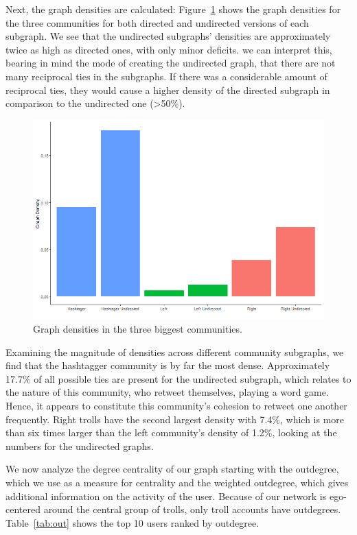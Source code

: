 \documentclass[12pt, titlepage=true, toc=bib]{scrartcl}
\begin{document}
Next, the graph densities are calculated: Figure~\ref{fig:dens} shows the graph densities for the three communities for both directed and undirected versions of each subgraph. We see that the undirected subgraphs' densities are approximately twice as high as directed ones, with only minor deficits. we can interpret this, bearing in mind the mode of creating the undirected graph, that there are not many reciprocal ties in the subgraphs. If there was a considerable amount of reciprocal ties, they would cause a higher density of the directed subgraph in comparison to the undirected one (>50\%).

\begin{figure}[!ht]
\centering
\includegraphics[width=0.95\linewidth]{final_figure3.png}
\caption[Graph densities]{Graph densities in the three biggest communities.}
\label{fig:dens}
\end{figure}

Examining the magnitude of densities across different community subgraphs, we find that the hashtagger community is by far the most dense. Approximately 17.7\% of all possible ties are present for the undirected subgraph, which relates to the nature of this community, who retweet themselves, playing a word game. Hence, it appears to constitute this community's cohesion to retweet one another frequently. Right trolls have the second largest density with 7.4\%, which is more than six times larger than the left community's density of 1.2\%, looking at the numbers for the undirected graphs.

We now analyze the degree centrality of our graph starting with the outdegree, which we use as a measure for centrality and the weighted outdegree, which gives additional information on the activity of the user. Because of our network is ego-centered around the central group of trolls, only troll accounts have outdegrees. Table~\ref{tab:out} shows the top 10 users ranked by outdegree.
\end{document}
